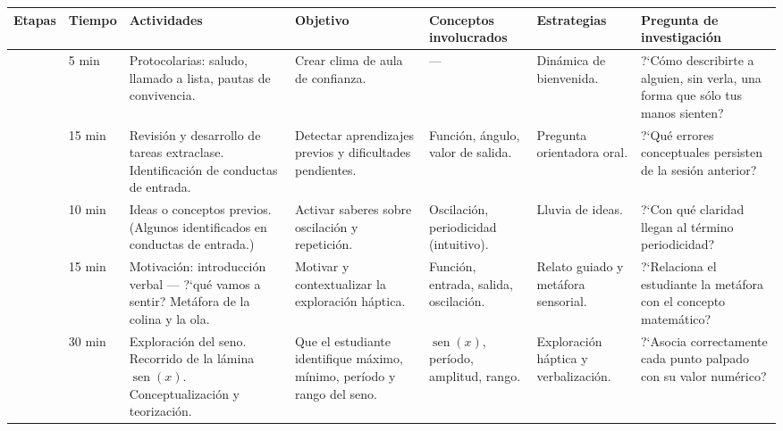 \documentclass[14pt, a4paper]{extarticle}
\renewcommand{\arraystretch}{1.3}
\begin{document}
{\footnotesize
\singlespacing
\setlength{\tabcolsep}{3pt}
\renewcommand{\arraystretch}{1.2}
\noindent
\begin{tabular}{|M{1.2cm}|M{0.95cm}|L{2.6cm}|L{2.2cm}|L{2.1cm}|L{1.9cm}|L{2.5cm}|}
\hline
Etapas &
Tiempo &
Actividades &
Objetivo &
Conceptos involucrados &
Estrategias &
Pregunta de investigaci\'on \\
\hline

& 5 min
& Protocolarias: saludo, llamado a lista, pautas de convivencia.
& Crear clima de aula de confianza.
& ---
& Din\'amica de bienvenida.
& ?`C\'omo describirte a alguien, sin verla, una forma que s\'olo tus manos sienten? \\

& 15 min
& Revisi\'on y desarrollo de tareas extraclase. Identificaci\'on de conductas de entrada.
& Detectar aprendizajes previos y dificultades pendientes.
& Funci\'on, \'angulo, valor de salida.
& Pregunta orientadora oral.
& ?`Qu\'e errores conceptuales persisten de la sesi\'on anterior? \\
\hline

& 10 min
& Ideas o conceptos previos. (Algunos identificados en conductas de entrada.)
& Activar saberes sobre oscilaci\'on y repetici\'on.
& Oscilaci\'on, periodicidad (intuitivo).
& Lluvia de ideas.
& ?`Con qu\'e claridad llegan al t\'ermino periodicidad? \\

& 15 min
& Motivaci\'on: introducci\'on verbal --- ?`qu\'e vamos a sentir? Met\'afora de la colina y la ola.
& Motivar y contextualizar la exploraci\'on h\'aptica.
& Funci\'on, entrada, salida, oscilaci\'on.
& Relato guiado y met\'afora sensorial.
& ?`Relaciona el estudiante la met\'afora con el concepto matem\'atico? \\

& 30 min
& Exploraci\'on del seno. Recorrido de la l\'amina $\operatorname{sen}(x)$. Conceptualizaci\'on y teorizaci\'on.
& Que el estudiante identifique m\'aximo, m\'inimo, per\'iodo y rango del seno.
& $\operatorname{sen}(x)$, per\'iodo, amplitud, rango.
& Exploraci\'on h\'aptica y verbalizaci\'on.
& ?`Asocia correctamente cada punto palpado con su valor num\'erico? \\


\end{tabular}}
\end{document}
